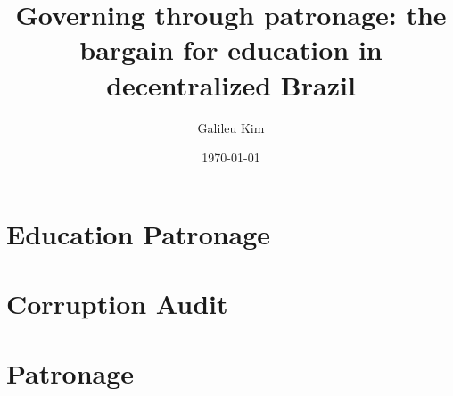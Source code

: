 \documentclass[12pt]{report}
\title{Governing through patronage: the bargain for education in decentralized Brazil}
\date{\today}
\author{Galileu Kim}
\affil{Princeton University}
\theoremstyle{definition}
\begin{document}
\tableofcontents

\chapter{Education Patronage}


\chapter{Corruption Audit}


\chapter{Patronage}


\newpage


\end{document}
